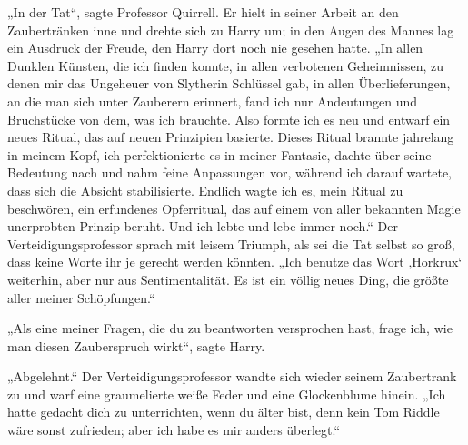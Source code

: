 „In der Tat“, sagte Professor Quirrell.
Er hielt in seiner Arbeit an den Zaubertränken inne und drehte sich zu Harry um; in den Augen des Mannes lag ein Ausdruck der Freude, den Harry dort noch nie gesehen hatte.
„In allen Dunklen Künsten, die ich finden konnte, in allen verbotenen Geheimnissen, zu denen mir das Ungeheuer von Slytherin Schlüssel gab, in allen Überlieferungen, an die man sich unter Zauberern erinnert, fand ich nur Andeutungen und Bruchstücke von dem, was ich brauchte. Also formte ich es neu und entwarf ein neues Ritual, das auf neuen Prinzipien basierte. Dieses Ritual brannte jahrelang in meinem Kopf, ich perfektionierte es in meiner Fantasie, dachte über seine Bedeutung nach und nahm feine Anpassungen vor, während ich darauf wartete, dass sich die Absicht stabilisierte. Endlich wagte ich es, mein Ritual zu beschwören, ein erfundenes Opferritual, das auf einem von aller bekannten Magie unerprobten Prinzip beruht. Und ich lebte und lebe immer noch.“
Der Verteidigungsprofessor sprach mit leisem Triumph, als sei die Tat selbst so groß, dass keine Worte ihr je gerecht werden könnten.
„Ich benutze das Wort ‚Horkrux‘ weiterhin, aber nur aus Sentimentalität. Es ist ein völlig neues Ding, die größte aller meiner Schöpfungen.“

„Als eine meiner Fragen, die du zu beantworten versprochen hast, frage ich, wie man diesen Zauberspruch wirkt“, sagte Harry.

„Abgelehnt.“
Der Verteidigungsprofessor wandte sich wieder seinem Zaubertrank zu und warf eine graumelierte weiße Feder und eine Glockenblume hinein.
„Ich hatte gedacht dich zu unterrichten, wenn du älter bist, denn kein Tom Riddle wäre sonst zufrieden; aber ich habe es mir anders überlegt.“

